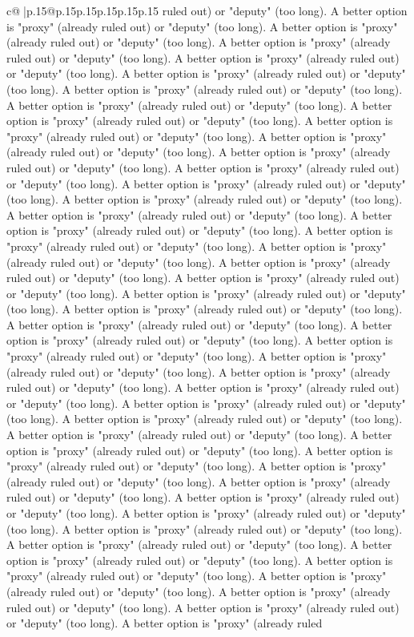 \documentclass{article}
\begin{document}
{\begin{supertabular}{c@{$\;$}|p{.15\linewidth}@{}p{.15\linewidth}p{.15\linewidth}p{.15\linewidth}p{.15\linewidth}p{.15\linewidth}}
{{{ruled out) or "deputy" (too long). A better option is "proxy" (already ruled out) or "deputy" (too long). A better option is "proxy" (already ruled out) or "deputy" (too long). A better option is "proxy" (already ruled out) or "deputy" (too long). A better option is "proxy" (already ruled out) or "deputy" (too long). A better option is "proxy" (already ruled out) or "deputy" (too long). A better option is "proxy" (already ruled out) or "deputy" (too long). A better option is "proxy" (already ruled out) or "deputy" (too long). A better option is "proxy" (already ruled out) or "deputy" (too long). A better option is "proxy" (already ruled out) or "deputy" (too long). A better option is "proxy" (already ruled out) or "deputy" (too long). A better option is "proxy" (already ruled out) or "deputy" (too long). A better option is "proxy" (already ruled out) or "deputy" (too long). A better option is "proxy" (already ruled out) or "deputy" (too long). A better option is "proxy" (already ruled out) or "deputy" (too long). A better option is "proxy" (already ruled out) or "deputy" (too long). A better option is "proxy" (already ruled out) or "deputy" (too long). A better option is "proxy" (already ruled out) or "deputy" (too long). A better option is "proxy" (already ruled out) or "deputy" (too long). A better option is "proxy" (already ruled out) or "deputy" (too long). A better option is "proxy" (already ruled out) or "deputy" (too long). A better option is "proxy" (already ruled out) or "deputy" (too long). A better option is "proxy" (already ruled out) or "deputy" (too long). A better option is "proxy" (already ruled out) or "deputy" (too long). A better option is "proxy" (already ruled out) or "deputy" (too long). A better option is "proxy" (already ruled out) or "deputy" (too long). A better option is "proxy" (already ruled out) or "deputy" (too long). A better option is "proxy" (already ruled out) or "deputy" (too long). A better option is "proxy" (already ruled out) or "deputy" (too long). A better option is "proxy" (already ruled out) or "deputy" (too long). A better option is "proxy" (already ruled out) or "deputy" (too long). A better option is "proxy" (already ruled out) or "deputy" (too long). A better option is "proxy" (already ruled out) or "deputy" (too long). A better option is "proxy" (already ruled out) or "deputy" (too long). A better option is "proxy" (already ruled out) or "deputy" (too long). A better option is "proxy" (already ruled out) or "deputy" (too long). A better option is "proxy" (already ruled out) or "deputy" (too long). A better option is "proxy" (already ruled out) or "deputy" (too long). A better option is "proxy" (already ruled out) or "deputy" (too long). A better option is "proxy" (already ruled out) or "deputy" (too long). A better option is "proxy" (already ruled out) or "deputy" (too long). A better option is "proxy" (already ruled out) or "deputy" (too long). A better option is "proxy" (already ruled out) or "deputy" (too long). A better option is "proxy" (already ruled out) or "deputy" (too long). A better option is "proxy" (already ruled out) or "deputy" (too long). A better option is "proxy" (already ruled }}}
\end{supertabular}}
\end{document}
